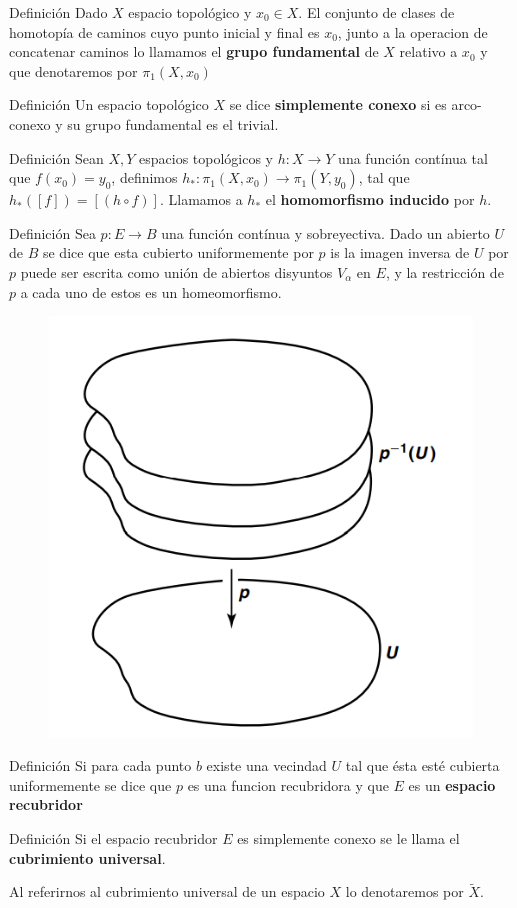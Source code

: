 \documentclass[xcolor=dvipsnames,10pt]{beamer}
\begin{document}
\begin{frame}
    \begin{block}{Definición}
        Dado $X$ espacio topológico y $x_0\in X$. El conjunto de clases de homotopía de caminos cuyo punto inicial y final es $x_0$, junto a la operacion de concatenar caminos lo llamamos el \textbf{grupo fundamental} de $X$ relativo a $x_0$ y que denotaremos por $\pi_1(X,x_0)$
        \end{block}

        \begin{block}{Definición}
        Un espacio topológico $X$ se dice \textbf{simplemente conexo} si es arco-conexo y su grupo fundamental es el trivial.
        \end{block}  
        \begin{block}{Definición}
            Sean $X,Y$ espacios topológicos y $h: X \rightarrow Y$ una función contínua tal que $f(x_0) = y_0$, definimos $h_*:\pi_1(X,x_0)\rightarrow \pi_1(Y,y_0)$, tal que $h_*([f]) = [(h \circ f)]$. Llamamos a $h_*$ el \textbf{homomorfismo inducido} por $h$.
        \end{block}
\end{frame}
\begin{frame}
    \begin{block}{Definición}
        Sea $p:E\to B$ una función contínua y sobreyectiva. Dado un abierto $U$ de $B$ se dice que esta cubierto uniformemente por $p$ is la imagen inversa de $U$ por $p$ puede ser escrita como unión de abiertos disyuntos $V_\alpha$ en $E$, y la restricción de $p$ a cada uno de estos es un homeomorfismo.
        \end{block} 
        \begin{figure}
            \centering
            \includegraphics[width=0.4\linewidth]{Imagenes/imagen_2025-07-10_120527033.png}
        \end{figure}   
\end{frame}
\begin{frame}
        \begin{block}{Definición}
        Si para cada punto $b$ existe una vecindad $U$ tal que ésta esté cubierta uniformemente se dice que $p$ es una funcion recubridora y que $E$ es un \textbf{espacio recubridor}
        \end{block} 
        \begin{block}{Definición}
            Si el espacio recubridor $E$ es simplemente conexo se le llama el \textbf{cubrimiento universal}.
        \end{block}
        Al referirnos al cubrimiento universal de un espacio $X$ lo denotaremos por $\tilde{X}.$
        
\end{frame}
\end{document}
